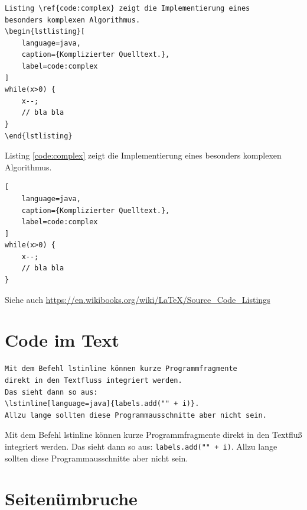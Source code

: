 \begin{minipage}[t]{\linewidth}
\begin{Verbatim}[frame=single]
Listing \ref{code:complex} zeigt die Implementierung eines 
besonders komplexen Algorithmus.
\begin{lstlisting}[
    language=java,
    caption={Komplizierter Quelltext.},
    label=code:complex
]
while(x>0) {
	x--;
	// bla bla
}
\end{lstlisting}
\end{Verbatim}
\end{minipage}

\begin{framed}
Listing \ref{code:complex} zeigt die Implementierung eines 
besonders komplexen Algorithmus.
\begin{lstlisting}[
    language=java,
    caption={Komplizierter Quelltext.},
    label=code:complex
]
while(x>0) {
	x--;
	// bla bla
}
\end{lstlisting}
\end{framed}

Siehe auch \url{https://en.wikibooks.org/wiki/LaTeX/Source_Code_Listings}

\section{Code im Text}

\begin{minipage}[t]{\linewidth}
\begin{Verbatim}[frame=single]
Mit dem Befehl lstinline können kurze Programmfragmente 
direkt in den Textfluss integriert werden.
Das sieht dann so aus: 
\lstinline[language=java]{labels.add("" + i)}.
Allzu lange sollten diese Programmausschnitte aber nicht sein.
\end{Verbatim}
\end{minipage}

Mit dem Befehl lstinline können kurze Programmfragmente 
direkt in den Textfluß integriert werden.
Das sieht dann so aus: 
\lstinline{labels.add("" + i)}.
Allzu lange sollten diese Programmausschnitte aber nicht sein.


\section{Seitenümbruche}

